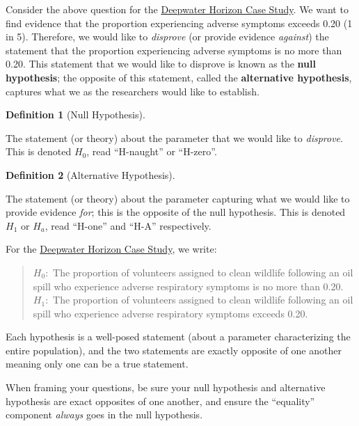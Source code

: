 \documentclass[
  letterpaper,
  DIV=11,
  numbers=noendperiod]{scrreprt}
\theoremstyle{definition}
\newtheorem{definition}{Definition}[chapter]
\theoremstyle{definition}
\theoremstyle{plain}
\theoremstyle{remark}
\begin{document}
Consider the above question for the
\href{01c-casedeepwater.qmd}{Deepwater Horizon Case Study}. We want to
find evidence that the proportion experiencing adverse symptoms exceeds
0.20 (1 in 5). Therefore, we would like to \emph{disprove} (or provide
evidence \emph{against}) the statement that the proportion experiencing
adverse symptoms is no more than 0.20. This statement that we would like
to disprove is known as the \textbf{null hypothesis}; the opposite of
this statement, called the \textbf{alternative hypothesis}, captures
what we as the researchers would like to establish.

\begin{definition}[Null
Hypothesis]\protect\hypertarget{def-null-hypothesis}{}\label{def-null-hypothesis}

The statement (or theory) about the parameter that we would like to
\emph{disprove}. This is denoted \(H_0\), read ``H-naught'' or
``H-zero''.

\end{definition}

\begin{definition}[Alternative
Hypothesis]\protect\hypertarget{def-alternative-hypothesis}{}\label{def-alternative-hypothesis}

The statement (or theory) about the parameter capturing what we would
like to provide evidence \emph{for}; this is the opposite of the null
hypothesis. This is denoted \(H_1\) or \(H_a\), read ``H-one'' and
``H-A'' respectively.

\end{definition}

For the \href{01c-casedeepwater.qmd}{Deepwater Horizon Case Study}, we
write:

\begin{quote}
\(H_0:\) The proportion of volunteers assigned to clean wildlife
following an oil spill who experience adverse respiratory symptoms is no
more than 0.20.\\
\(H_1:\) The proportion of volunteers assigned to clean wildlife
following an oil spill who experience adverse respiratory symptoms
exceeds 0.20.
\end{quote}

Each hypothesis is a well-posed statement (about a parameter
characterizing the entire population), and the two statements are
exactly opposite of one another meaning only one can be a true
statement.

\begin{tcolorbox}[enhanced jigsaw, colbacktitle=quarto-callout-note-color!10!white, colback=white, left=2mm, title=\textcolor{quarto-callout-note-color}{\faInfo}\hspace{0.5em}{Note}, toptitle=1mm, leftrule=.75mm, breakable, bottomrule=.15mm, arc=.35mm, rightrule=.15mm, toprule=.15mm, coltitle=black, opacityback=0, colframe=quarto-callout-note-color-frame, opacitybacktitle=0.6, bottomtitle=1mm, titlerule=0mm]

When framing your questions, be sure your null hypothesis and
alternative hypothesis are exact opposites of one another, and ensure
the ``equality'' component \emph{always} goes in the null hypothesis.

\end{tcolorbox}
\end{document}
